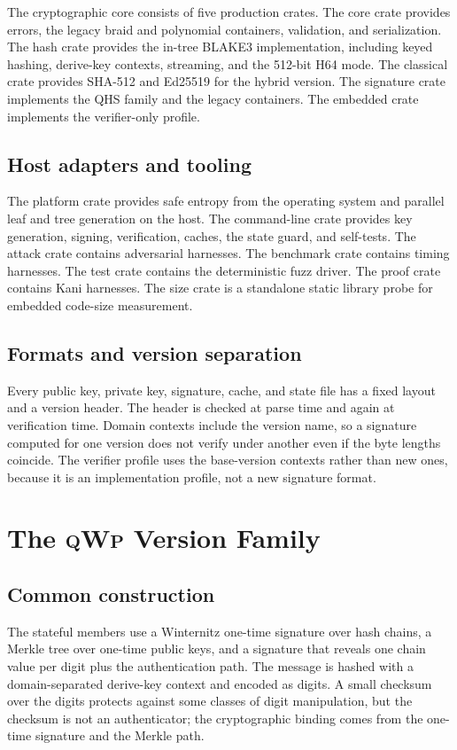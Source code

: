 \documentclass[11pt,a4paper]{article}
\newcommand{\qwp}{\textsc{qWp}}
\begin{document}
The cryptographic core consists of five production crates. The core crate
provides errors, the legacy braid and polynomial containers, validation, and
serialization. The hash crate provides the in-tree BLAKE3 implementation,
including keyed hashing, derive-key contexts, streaming, and the 512-bit H64
mode. The classical crate provides SHA-512 and Ed25519 for the hybrid version.
The signature crate implements the QHS family and the legacy containers. The
embedded crate implements the verifier-only profile.

\subsection{Host adapters and tooling}

The platform crate provides safe entropy from the operating system and
parallel leaf and tree generation on the host. The command-line crate provides
key generation, signing, verification, caches, the state guard, and self-tests.
The attack crate contains adversarial harnesses. The benchmark crate contains
timing harnesses. The test crate contains the deterministic fuzz driver. The
proof crate contains Kani harnesses. The size crate is a standalone static
library probe for embedded code-size measurement.

\subsection{Formats and version separation}

Every public key, private key, signature, cache, and state file has a fixed
layout and a version header. The header is checked at parse time and again at
verification time. Domain contexts include the version name, so a signature
computed for one version does not verify under another even if the byte lengths
coincide. The verifier profile uses the base-version contexts rather than new
ones, because it is an implementation profile, not a new signature format.

\section{The \qwp{} Version Family}

\subsection{Common construction}

The stateful members use a Winternitz one-time signature over hash chains, a
Merkle tree over one-time public keys, and a signature that reveals one chain
value per digit plus the authentication path. The message is hashed with a
domain-separated derive-key context and encoded as digits. A small checksum
over the digits protects against some classes of digit manipulation, but the
checksum is not an authenticator; the cryptographic binding comes from the
one-time signature and the Merkle path.
\end{document}
